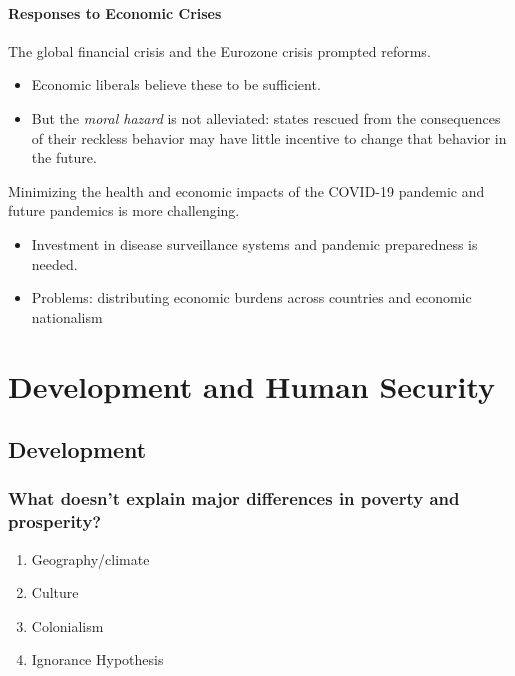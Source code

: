\documentclass[
]{book}
\begin{document}
\hypertarget{responses-to-economic-crises}{%
\subsubsection{Responses to Economic Crises}\label{responses-to-economic-crises}}

The global financial crisis and the Eurozone crisis prompted reforms.

\begin{itemize}
\item
  Economic liberals believe these to be sufficient.
\item
  But the \emph{moral hazard} is not alleviated: states rescued from the consequences of their reckless behavior may have little incentive to change that behavior in the future.
\end{itemize}

Minimizing the health and economic impacts of the COVID-19 pandemic and future pandemics is more challenging.

\begin{itemize}
\item
  Investment in disease surveillance systems and pandemic preparedness is needed.
\item
  Problems: distributing economic burdens across countries and economic nationalism
\end{itemize}

\hypertarget{development-and-human-security}{%
\chapter{Development and Human Security}\label{development-and-human-security}}

\hypertarget{development}{%
\section{Development}\label{development}}

\hypertarget{what-doesnt-explain-major-differences-in-poverty-and-prosperity}{%
\subsection{What doesn't explain major differences in poverty and prosperity?}\label{what-doesnt-explain-major-differences-in-poverty-and-prosperity}}

\begin{enumerate}
\def\labelenumi{\arabic{enumi}.}
\item
  Geography/climate
\item
  Culture
\item
  Colonialism
\item
  Ignorance Hypothesis
\end{enumerate}
\end{document}
